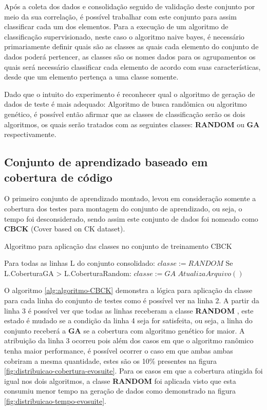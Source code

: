 \documentclass[
	12pt,				%
	oneside,			%
	a4paper,			%
	english,			%
	brazil				%
	]{abntex2ppgsi}
\begin{document}
Após a coleta dos dados e consolidação seguido de validação deste conjunto por meio da sua correlação, é possível trabalhar com este conjunto para assim classificar cada um dos elementos. Para a execução de um algoritmo de classificação supervisionado, neste caso o algoritmo naive bayes, é necessário primariamente definir quais são as classes as quais cada elemento do conjunto de dados poderá pertencer, as classes são os nomes dados para os agrupamentos os quais será necessário classificar cada elemento de acordo com suas características, desde que um elemento pertença a uma classe somente.

Dado que o intuito do experimento é reconhecer qual o algoritmo de geração de dados de teste é mais adequado: Algoritmo de busca randômica ou algoritmo genético, é possível então afirmar que as classes de classificação serão os dois algoritmos, os quais serão tratados com as seguintes classes:  \textbf{RANDOM} ou \textbf{GA} respectivamente. 

\subsection{Conjunto de aprendizado baseado em cobertura de código}

O primeiro conjunto de aprendizado montado, levou em consideração somente a cobertura dos testes para montagem do conjunto de aprendizado, ou seja, o tempo foi desconsiderado, sendo assim este conjunto de dados foi nomeado como \textbf{CBCK} (Cover based on CK dataset).

\begin{algorithm}[htbp]
\caption{Algoritmo para aplicação das classes no conjunto de treinamento CBCK}
\label{alg:algoritmo-CBCK}
\begin{algorithmic}[1]

\State Para todas as linhas L do conjunto consolidado:
\State $classe := RANDOM$
\State 		Se L.CoberturaGA > L.CoberturaRandom: $classe := GA$
\State $AtualizaArquivo()$
\EndProcedure
\end{algorithmic}
\end{algorithm}

O algoritmo \ref{alg:algoritmo-CBCK} demonstra a lógica para aplicação da classe para cada linha do conjunto de testes como é possível ver na linha 2. A partir da linha 3 é possível ver que todas as linhas receberam a classe \textbf{RANDOM} , este estado é mudado se a condição da linha 4 seja for satisfeita, ou seja, a linha do conjunto receberá a  \textbf{GA} se a cobertura com algoritmo genético for maior. A atribuição da linha 3 ocorreu pois além dos casos em que o algoritmo ranômico tenha maior performance, é possível ocorrer o caso em que ambas ambas cobriram a mesma quantidade, estes são os 10\% presentes na figura \ref{fig:distribuicao-cobertura-evosuite}. Para os casos em que a cobertura atingida foi igual nos dois algoritmos, a classe  \textbf{RANDOM}  foi aplicada visto que esta consumiu menor tempo na geração de dados como demonstrado na figura \ref{fig:distribuicao-tempo-evosuite}.
\end{document}
